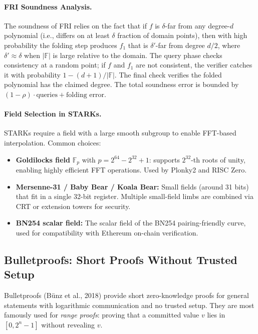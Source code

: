 \paragraph{FRI Soundness Analysis.} The soundness of FRI relies on the fact that if $f$ is $\delta$-far from any degree-$d$ polynomial (i.e., differs on at least $\delta$ fraction of domain points), then with high probability the folding step produces $f_1$ that is $\delta'$-far from degree $d/2$, where $\delta' \approx \delta$ when $|\mathbb{F}|$ is large relative to the domain. The query phase checks consistency at a random point; if $f$ and $f_1$ are not consistent, the verifier catches it with probability $1 - (d+1)/|\mathbb{F}|$. The final check verifies the folded polynomial has the claimed degree. The total soundness error is bounded by $(1 - \rho) \cdot \text{queries} + \text{folding error}$.

\paragraph{Field Selection in STARKs.} STARKs require a field with a large smooth subgroup to enable FFT-based interpolation. Common choices:
\begin{itemize}
\item \textbf{Goldilocks field} $\mathbb{F}_p$ with $p = 2^{64} - 2^{32} + 1$: supports $2^{32}$-th roots of unity, enabling highly efficient FFT operations. Used by Plonky2 and RISC Zero.
\item \textbf{Mersenne-31 / Baby Bear / Koala Bear:} Small fields (around 31 bits) that fit in a single 32-bit register. Multiple small-field limbs are combined via CRT or extension towers for security.
\item \textbf{BN254 scalar field:} The scalar field of the BN254 pairing-friendly curve, used for compatibility with Ethereum on-chain verification.
\end{itemize}

\subsection{Bulletproofs: Short Proofs Without Trusted Setup}
\label{sec:zk:bulletproofs}

Bulletproofs (B\"unz et al., 2018) provide short zero-knowledge proofs for general statements with logarithmic communication and no trusted setup. They are most famously used for \emph{range proofs}: proving that a committed value $v$ lies in $[0, 2^n - 1]$ without revealing $v$.

